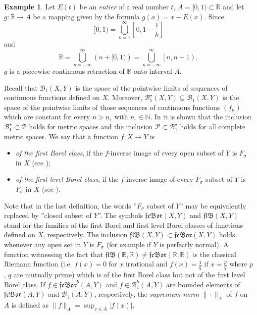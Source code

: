 \documentclass{amsart}
\theoremstyle{definition}
\newtheorem{Prz}{Example}
\newcommand\mR{{\mathbb R}}
\newcommand\mN{{\mathbb N}}
\newcommand\B{{\mathscr B}}
\newcommand\PC{{\mathscr{P}}}
\newcommand\cn{\colon}
\newcommand\fs{F_\sigma}
\newcommand\fcb{\mathfrak{fcBor}}
\newcommand\flb{\mathfrak{flB}}
\begin{document}
\begin{Prz}
Let $E(t)$ be an \emph{entier} of a real number $t$, $A=[0,1)\subset\mR$ and let $g\cn\mR\to A$ be a mapping given by the formula $g(x)=x-E(x)$.
Since 
$$
[0,1)=\bigcup_{k=1}^\infty\left[0,1-\frac{1}{k}\right]
$$ and 
$$
\mR=\bigcup_{n=-\infty}^\infty\left(n+[0,1)\right)=\bigcup_{n=-\infty}^\infty\left[n,n+1\right),
$$
$g$ is a piecewise continuous retraction of $\mR$ onto interval $A$.
\end{Prz}
Recall that $\B_1(X,Y)$ is the space of the pointwise limits of sequences of conti\-nuous functions defined on $X$. Moreover, 
$\B_1^\star(X,Y)\subsetneq\B_1(X,Y)$ is the space of the pointwise limits of those sequences
of continuous functions $(f_n)$ which are constant for every $n>n_\epsilon$ with $n_\epsilon\in\mN$. In \cite{Kirch} it is shown that the inclusion 
$\B_1^\star\subset\PC$ holds for metric spaces and the inclusion $\PC\subset\B_1^\star$ holds for all complete metric spaces.  
We say that a function $f\cn X\to Y$ is
\begin{itemize}
\item {\em of the first Borel class}, if the $f$-inverse image of every open subset of $Y$ is $\fs$ in $X$ (see \cite[p. 1]{JayRog});
\item {\em of the first level Borel class}, if the $f$-inverse image of every $\fs$ subset of $Y$ is $\fs$ in $X$ (see \cite[p. 1]{JayRog}).
\end{itemize}
Note that in the last definition, the words ''$\fs$ subset of $Y$'' may be equi\-valently replaced by ''closed subset of $Y$''.
The symbols $\fcb(X,Y)$ and $\flb(X,Y)$ stand for the families of the first Borel and first level Borel classes of functions
defined on $X$, respectively. The inclusion $\flb(X,Y)\subset\fcb(X,Y)$
holds whenever any open set in $Y$ is $\fs$ (for example if $Y$ is perfectly normal). A function witnessing the fact that
$\flb(\mR,\mR)\neq\fcb(\mR,\mR)$ is the classical Riemann function (i.e. $f(x)=0$ for $x$ irrational and $f(x)=\frac{1}{q}$ if $x=\frac{p}{q}$ where
$p$, $q$ are mutually prime) which is of the first Borel class but not of the first level Borel class.
If $f\in\fcb^b(A,Y)$ and $f\in\B_1^b(A,Y)$ are bounded elements of $\fcb(A,Y)$ and $\B_1(A,Y)$, respectively, the \emph{supremum norm}
$\|\cdot\|_A$ of $f$ on $A$ is defined as $\|f\|_A=\sup_{x\in A}|f(x)|$.
\end{document}
